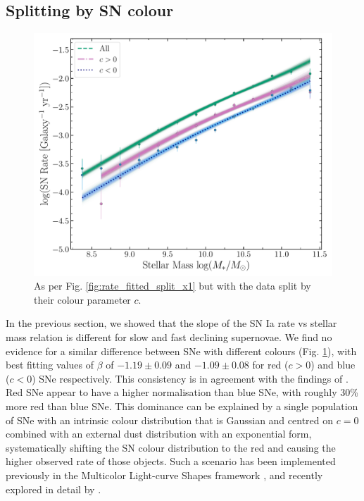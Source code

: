 \documentclass[fleqn,usenatbib]{mnras}
\begin{document}
\subsection{Splitting by SN colour \label{subsec:split_c}}
\begin{figure}
    \centering
    \includegraphics[width=.5\textwidth]{figs/rate_vs_mass_DTD_fit_beta_norm_Qerf1.1_split_c.pdf}
    \caption{As per Fig. \ref{fig:rate_fitted_split_x1} but with the data split by their colour parameter $c$.%
    \label{fig:rate_fitted_split_c}}
\end{figure}

In the previous section, we showed that the slope of the SN Ia rate vs stellar mass relation is different for slow and fast declining supernovae. We find no evidence for a similar difference between SNe with different colours (Fig. \ref{fig:rate_fitted_split_c}), with best fitting values of $\beta$ of $-1.19\pm0.09$ and $-1.09\pm0.08$ for red ($c > 0$) and blue ($c<0$) SNe respectively. This consistency is in agreement with the findings of \citet{Sullivan2010}. Red SNe appear to have a higher normalisation than blue SNe, with roughly 30\% more red than blue SNe. This dominance can be explained by a single population of SNe with an intrinsic colour distribution that is Gaussian and centred on $c=0$ combined with an external dust distribution with an exponential form, systematically shifting the SN colour distribution to the red and causing the higher observed rate of those objects. Such a scenario has been implemented previously in the Multicolor Light-curve Shapes framework \citep{Riess1996,Jha2007}, and recently explored in detail by \citet{Brout2020}. 
\end{document}
